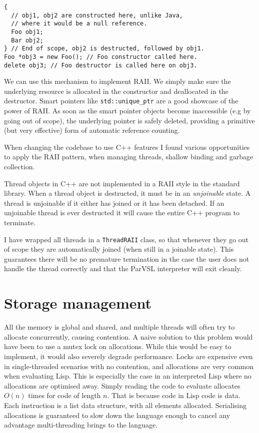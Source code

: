 \begin{verbatim}
{
  // obj1, obj2 are constructed here, unlike Java,
  // where it would be a null reference.
  Foo obj1;
  Bar obj2;
} // End of scope, obj2 is destructed, followed by obj1.
Foo *obj3 = new Foo(); // Foo constructor called here.
delete obj3; // Foo destructor is called here on obj3.
\end{verbatim}

We can use this mechanism to implement RAII. We simply make sure
the underlying resource is allocated in the constructor and deallocated in the destructor.
Smart pointers like \texttt{std::unique\_ptr} are a good showcase of the power of RAII. As soon as the
smart pointer objects become inaccessible (e.g by going out of scope), the underlying pointer
is safely deleted, providing a primitive (but very effective) form of automatic reference counting.

When changing the codebase to use C++ features I found various opportunities to apply the RAII pattern,
when managing threads, shallow binding and garbage collection.

Thread objects in C++ are not implemented in a RAII style in the standard library. When a thread object
is destructed, it must be in an \emph{unjoinable} state. A thread is unjoinable if it either has joined or
it has been detached. If an unjoinable thread is ever destructed it will cause the entire C++ program to
terminate.

I have wrapped all threads in a \texttt{ThreadRAII} class, so that whenever they go out of scope they are automatically
joined (when still in a joinable state). This guarantees there will be no premature termination in the case the
user does not handle the thread correctly and that the ParVSL interpreter will exit cleanly.


\section{Storage management}
\label{sec:storage}
All the memory is global and shared, and multiple threads will often try
to allocate concurrently, causing contention. A naive solution to this problem
would have been to use a mutex lock on allocations. While this would be easy to
implement, it would also severely degrade performance. Locks are expensive even
in single-threaded scenarios with no contention, and allocations are very common
when evaluating Lisp. This is especially the case in an interpreted Lisp where no
allocations are optimised away. Simply reading the code to evaluate allocates
\(O(n)\) times for code of length \(n\). That is because code in Lisp code is data.
Each instruction is a list data structure, with all elements allocated.
Serialising allocations is guaranteed to slow down the language enough to cancel
any advantage multi-threading brings to the language.

